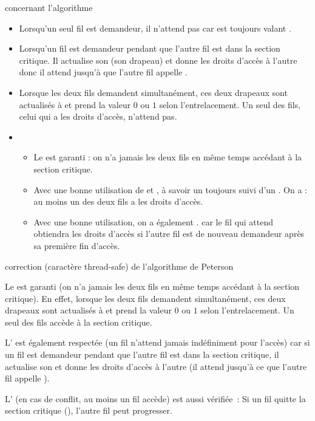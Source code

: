 \begin{adjustwidth}{-3cm}{-3cm}
\begin{remarque}{}{concernant l'algorithme}
    \begin{itemize}
        \item Lorsqu'un seul fil est demandeur, il n'attend pas car  est toujours valant .
        \item Lorsqu'un fil est demandeur pendant que l'autre fil est dans la section critique. Il actualise son  (son drapeau) et donne les droits d'accès à l'autre donc il attend jusqu'à que l'autre fil appelle .
        \item Lorsque les deux fils demandent simultanément, ces deux drapeaux sont actualisés à  et  prend la valeur $0$ ou $1$ selon l'entrelacement. Un seul des fils, celui qui a les droits d'accès, n'attend pas.
        \item \begin{itemize}
            \item Le  est garanti : on n'a jamais les deux fils en même temps accédant à la section critique.
            \item Avec une bonne utilisation de  et , à savoir un  toujours suivi d'un . On a  : au moins un des deux fils a les droits d'accès.
            \item Avec une bonne utilisation, on a également . car le fil qui attend obtiendra les droits d'accès si l'autre fil est de nouveau demandeur après sa première fin d'accès.
        \end{itemize}
    \end{itemize}
\end{remarque}

\begin{remarque}{}{correction (caractère thread-safe) de l'algorithme de Peterson}
    \begin{enumeratebf}
        \item Le  est garanti (on n'a jamais les deux fils en même temps accédant à la section critique). En effet, lorsque les deux fils demandent simultanément, ces deux drapeaux sont actualisés à  et  prend la valeur $0$ ou $1$ selon l'entrelacement. Un seul des fils accède à la section critique.
        \item L' est également respectée (un fil n'attend jamais indéfiniment pour l'accès) car si un fil est demandeur pendant que l'autre fil est dans la section critique, il actualise son  et donne les droits d'accès à l'autre (il attend jusqu'à ce que l'autre fil appelle ).
        \item L' (en cas de conflit, au moins un fil accède) est aussi vérifiée~: Si un fil quitte la section critique (), l’autre fil peut progresser.
    \end{enumeratebf}
\end{remarque}


\end{adjustwidth}
